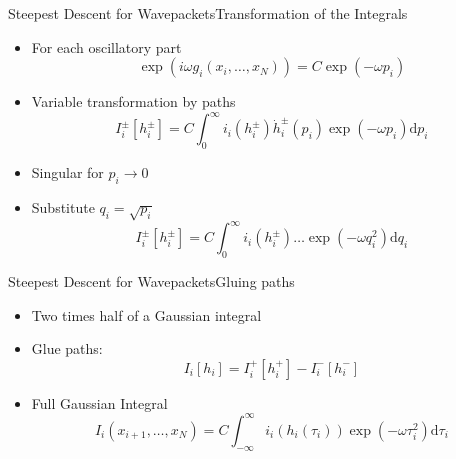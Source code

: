\documentclass{beamer}
\begin{document}
\begin{frame}{Steepest Descent for Wavepackets}{Transformation of the Integrals}
  \begin{itemize}
    \item For each oscillatory part
    \begin{equation*}
      \exp\left(i\omega g_i\left(x_i,\ldots,x_N\right)\right)
      =
      C
      \exp\left(- \omega p_i\right)
    \end{equation*}
    \item Variable transformation by paths
    \begin{equation*}
        I_i^{\pm}[h_i^{\pm}] =
        C
        \int_0^\infty
          i_i\left(h_i^{\pm}\right)
          \dot{h}_i^{\pm}\left(p_i\right)
          \exp\left(- \omega p_i\right)
        \mathrm{d}p_i
    \end{equation*}
    \item Singular for $p_i \rightarrow 0$
    \item Substitute $q_i = \sqrt{p_i}$
    \begin{equation*}
        I_i^{\pm}[h_i^{\pm}] =
        C
        \int_0^\infty
          i_i\left(h_i^{\pm}\right)
          \ldots
          \exp\left(- \omega q_i^2\right)
        \mathrm{d}q_i
    \end{equation*}
  \end{itemize}
\end{frame}


\begin{frame}{Steepest Descent for Wavepackets}{Gluing paths}
  \begin{itemize}
    \item Two times half of a Gaussian integral
    \item Glue paths:
    \begin{equation*}
      I_i[h_i] =
      I_i^{+}[h_i^{+}]
      -
      I_i^{-}[h_i^{-}]
    \end{equation*}
    \item Full Gaussian Integral
    \begin{equation*}
      I_i\left(x_{i+1},\ldots,x_N\right) =
      C
      \int_{-\infty}^\infty
        i_i\left(h_i\left(\tau_i\right)\right)
        \exp\left(- \omega \tau_i^2\right)
      \mathrm{d}\tau_i
    \end{equation*}
  \end{itemize}
\end{frame}
\end{document}
